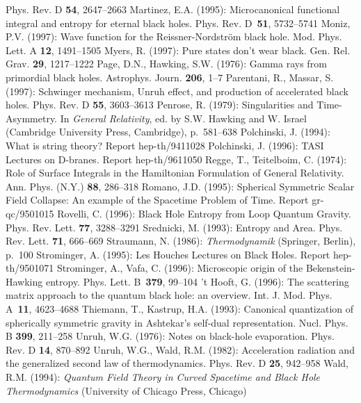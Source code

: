 \begin{thebibliography}
Phys. Rev. D {\bf 54}, 2647--2663
%
\bibitem{}{}{}
Martinez, E.A. (1995): Microcanonical functional integral and
entropy for eternal black holes. Phys. Rev. D~{\bf 51}, 5732--5741
%
\bibitem{}{}{}
Moniz, P.V. (1997): Wave function for the Reissner-Nordstr\"om
black hole. Mod. Phys. Lett. A {\bf 12}, 1491--1505
%
\bibitem{}{}{}
Myers, R. (1997): Pure states don't wear black. 
Gen. Rel. Grav. {\bf 29}, 1217--1222
%
\bibitem{}{}{}
Page, D.N., Hawking, S.W. (1976): Gamma rays from primordial
black holes. Astrophys. Journ. {\bf 206}, 1--7
%
\bibitem{}{}{}
Parentani, R., Massar, S. (1997): Schwinger mechanism, Unruh effect,
and production of accelerated black holes.
Phys. Rev. D {\bf 55}, 3603--3613
%
\bibitem{}{}{}
Penrose, R. (1979): Singularities and Time-Asymmetry.
In {\it General Relativity}, ed. by S.W. Hawking and W. Israel
(Cambridge University Press, Cambridge), p.~581--638
%
\bibitem{}{}{}
Polchinski, J. (1994): What is string theory? Report hep-th/9411028
%
\bibitem{}{}{}
Polchinski, J. (1996): TASI Lectures on D-branes. Report hep-th/9611050
%
\bibitem{}{}{}
Regge, T., Teitelboim, C. (1974): Role of Surface Integrals in the
Hamiltonian Formulation of General Relativity. Ann. Phys. (N.Y.)
{\bf 88}, 286--318
%
\bibitem{}{}{}
Romano, J.D. (1995): Spherical Symmetric Scalar Field Collapse:
An example of the Spacetime Problem of Time. Report gr-qc/9501015
%
\bibitem{}{}{}
Rovelli, C. (1996): Black Hole Entropy from Loop Quantum Gravity.
Phys. Rev. Lett. {\bf 77}, 3288--3291
%
\bibitem{}{}{}
Srednicki, M. (1993): Entropy and Area. Phys. Rev. Lett.
{\bf 71}, 666--669
%
\bibitem{}{}{}
Straumann, N. (1986): {\it Thermodynamik} (Springer, Berlin), p.~100
%
\bibitem{}{}{}
Strominger, A. (1995): Les Houches Lectures on Black Holes.
Report hep-th/9501071
%
\bibitem{}{}{}
Strominger, A., Vafa, C. (1996): Microscopic origin of the
Bekenstein-Hawking entropy. Phys. Lett. B~{\bf 379}, 99--104
%
\bibitem{}{}{}
't Hooft, G. (1996): The scattering matrix approach to the quantum
black hole: an overview. Int. J. Mod. Phys. A~{\bf 11}, 4623--4688
%
\bibitem{}{}{}
Thiemann, T., Kastrup, H.A. (1993): Canonical quantization
of spherically symmetric gravity in Ashtekar's self-dual representation.
Nucl. Phys. B {\bf 399}, 211--258
%
\bibitem{}{}{}
Unruh, W.G. (1976): Notes on black-hole evaporation. Phys. Rev. D {\bf 14},
870--892
%
\bibitem{}{}{}
Unruh, W.G., Wald, R.M. (1982): Acceleration radiation and the
generalized second law of thermodynamics. Phys. Rev. D {\bf 25},
942--958
%
\bibitem{}{}{}
Wald, R.M. (1994): {\it Quantum Field Theory in Curved Spacetime
and Black Hole Thermodynamics} (University of Chicago Press, Chicago)

\end{thebibliography}
